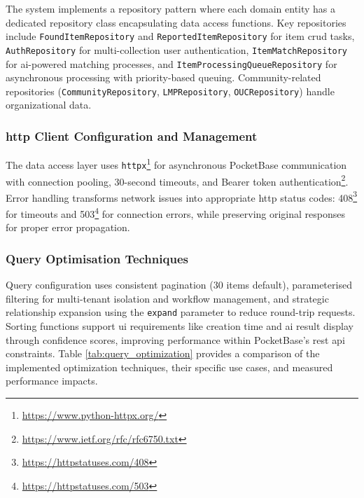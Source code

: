 The system implements a repository pattern where each domain entity has a dedicated repository class encapsulating data access functions. Key repositories include \texttt{FoundItemRepository} and \texttt{ReportedItemRepository} for item \ac{crud} tasks, \texttt{AuthRepository} for multi-collection user authentication, \texttt{ItemMatchRepository} for \ac{ai}-powered matching processes, and \texttt{ItemProcessingQueueRepository} for asynchronous processing with priority-based queuing. Community-related repositories (\texttt{CommunityRepository}, \texttt{LMPRepository}, \texttt{OUCRepository}) handle organizational data.

\subsubsection{\acs{http} Client Configuration and Management}

The data access layer uses \texttt{httpx}\footnote{\url{https://www.python-httpx.org/}} for asynchronous PocketBase communication with connection pooling, 30-second timeouts, and Bearer token authentication\footnote{\url{https://www.ietf.org/rfc/rfc6750.txt}}. Error handling transforms network issues into appropriate \ac{http} status codes: 408\footnote{\url{https://httpstatuses.com/408}} for timeouts and 503\footnote{\url{https://httpstatuses.com/503}} for connection errors, while preserving original responses for proper error propagation.

\subsubsection{Query Optimisation Techniques}

Query configuration uses consistent pagination (30 items default), parameterised filtering for multi-tenant isolation and workflow management, and strategic relationship expansion using the \texttt{expand} parameter to reduce round-trip requests. Sorting functions support \ac{ui} requirements like creation time and \ac{ai} result display through confidence scores, improving performance within PocketBase's \ac{rest} \ac{api} constraints. Table \ref{tab:query_optimization} provides a comparison of the implemented optimization techniques, their specific use cases, and measured performance impacts.

